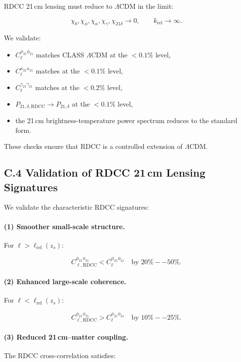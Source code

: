\documentclass[11pt,a4paper]{article}
\begin{document}
RDCC 21\,cm lensing must reduce to $\Lambda$CDM in the limit:


\[
\chi_{b},\chi_{\phi},\chi_{\kappa},\chi_{\gamma},\chi_{21\delta} \rightarrow 0,
\qquad
k_{\mathrm{rel}} \rightarrow \infty.
\]



We validate:
\begin{itemize}
\item $C_{\ell}^{\phi_{21}\phi_{21}}$ matches CLASS $\Lambda$CDM at the $<0.1\%$ level,
\item $C_{\ell}^{\kappa_{21}\kappa_{21}}$ matches at the $<0.1\%$ level,
\item $C_{\ell}^{\gamma_{21}\gamma_{21}}$ matches at the $<0.2\%$ level,
\item $P_{21,\delta,\mathrm{RDCC}} \rightarrow P_{21,\delta}$ at the $<0.1\%$ level,
\item the 21\,cm brightness-temperature power spectrum reduces to the standard form.
\end{itemize}

These checks ensure that RDCC is a controlled extension of $\Lambda$CDM.

\subsection*{C.4 Validation of RDCC 21\,cm Lensing Signatures}

We validate the characteristic RDCC signatures:

\paragraph{(1) Smoother small-scale structure.}
For $\ell > \ell_{\mathrm{rel}}(z_{s})$:


\[
C_{\ell,\mathrm{RDCC}}^{\phi_{21}\phi_{21}}
<
C_{\ell}^{\phi_{21}\phi_{21}}
\quad \text{by } 20\%--50\%.
\]



\paragraph{(2) Enhanced large-scale coherence.}
For $\ell < \ell_{\mathrm{rel}}(z_{s})$:


\[
C_{\ell,\mathrm{RDCC}}^{\phi_{21}\phi_{21}}
>
C_{\ell}^{\phi_{21}\phi_{21}}
\quad \text{by } 10\%--25\%.
\]



\paragraph{(3) Reduced 21\,cm–matter coupling.}
The RDCC cross-correlation satisfies:
\end{document}
